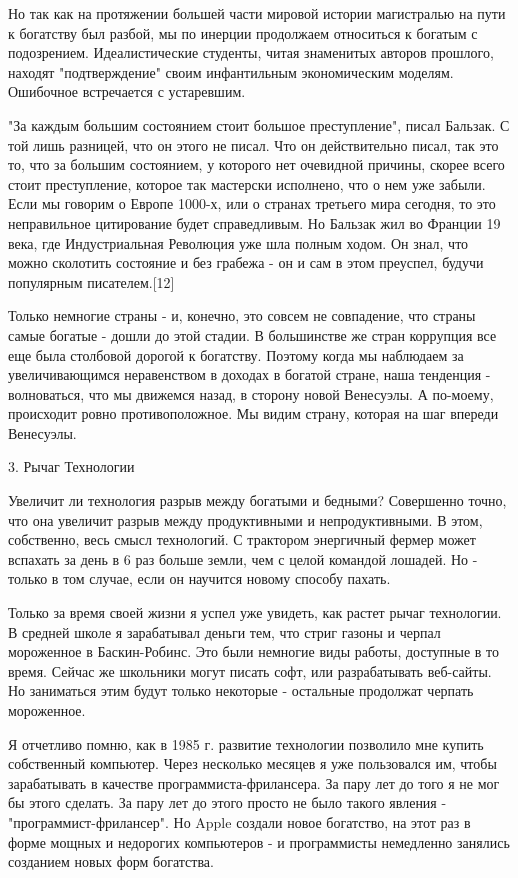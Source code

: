 \documentclass[ebook,12pt,oneside,openany]{memoir}
\begin{document}
Но так как на протяжении большей части мировой истории магистралью на
пути к богатству был разбой, мы по инерции продолжаем относиться к
богатым с подозрением. Идеалистические студенты, читая знаменитых
авторов прошлого, находят "подтверждение" своим инфантильным
экономическим моделям. Ошибочное встречается с устаревшим.

"За каждым большим состоянием стоит большое преступление", писал
Бальзак. С той лишь разницей, что он этого не писал. Что он
действительно писал, так это то, что за большим состоянием, у которого
нет очевидной причины, скорее всего стоит преступление, которое так
мастерски исполнено, что о нем уже забыли. Если мы говорим о Европе
1000-х, или о странах третьего мира сегодня, то это неправильное
цитирование будет справедливым. Но Бальзак жил во Франции 19 века, где
Индустриальная Революция уже шла полным ходом. Он знал, что можно
сколотить состояние и без грабежа - он и сам в этом преуспел, будучи
популярным писателем.[12]

Только немногие страны - и, конечно, это совсем не совпадение, что
страны самые богатые - дошли до этой стадии. В большинстве же стран
коррупция все еще была столбовой дорогой к богатству. Поэтому когда мы
наблюдаем за увеличивающимся неравенством в доходах в богатой стране,
наша тенденция - волноваться, что мы движемся назад, в сторону новой
Венесуэлы. А по-моему, происходит ровно противоположное. Мы видим
страну, которая на шаг впереди Венесуэлы.


3. Рычаг Технологии

Увеличит ли технология разрыв между богатыми и бедными? Совершенно
точно, что она увеличит разрыв между продуктивными и непродуктивными.
В этом, собственно, весь смысл технологий. С трактором энергичный
фермер может вспахать за день в 6 раз больше земли, чем с целой
командой лошадей. Но - только в том случае, если он научится новому
способу пахать.

Только за время своей жизни я успел уже увидеть, как растет рычаг
технологии. В средней школе я зарабатывал деньги тем, что стриг газоны
и черпал мороженное в Баскин-Робинс. Это были немногие виды работы,
доступные в то время. Сейчас же школьники могут писать софт, или
разрабатывать веб-сайты. Но заниматься этим будут только некоторые -
остальные продолжат черпать мороженное.

Я отчетливо помню, как в 1985 г. развитие технологии позволило мне
купить собственный компьютер. Через несколько месяцев я уже
пользовался им, чтобы зарабатывать в качестве программиста-фрилансера.
За пару лет до того я не мог бы этого сделать. За пару лет до этого
просто не было такого явления - "программист-фрилансер". Но Apple
создали новое богатство, на этот раз в форме мощных и недорогих
компьютеров - и программисты немедленно занялись созданием новых форм
богатства.
\end{document}
